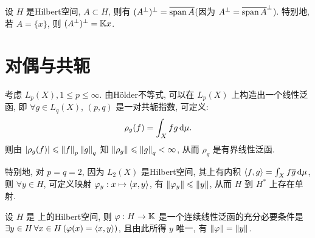     \begin{Remark}
        设 $ H $ 是Hilbert空间, $ A\subset H $, 则有 $ (A^{\bot})^{\bot}=\overline{\operatorname{span} A} $(因为 $ A^{\bot}=\overline{\operatorname{span} A}^{\bot} $). 特别地, 若 $ A=\{ x \} $, 则 $ (A^{\bot})^{\bot}=\mathbb{K} x $.
    \end{Remark}

\section{对偶与共轭}

    考虑 $ L_{p}(X), 1\leqslant p\leqslant\infty $. 由H\"older不等式, 可以在 $ L_{p}(X) $ 上构造出一个线性泛函, 即 $ \forall g\in L_{q}(X) $, $ (p, q) $ 是一对共轭指数, 可定义:
    \[
        \rho_{g}(f)=\int_{X}fg\,\mathrm{d}\mu.
    \]
    则由 $ \left| \rho_{g}(f) \right| \leqslant\left\| f \right\|_{p}\left\| g \right\|_{q} $ 知 $ \left\| \rho_{g} \right\|\leqslant\left\| g \right\|_{q}<\infty $, 从而 $ \rho_{g} $ 是有界线性泛函.

    特别地, 对 $ p=q=2 $, 因为 $ L_{2}(X) $ 是Hilbert空间, 其上有内积 $ \left\langle f, g \right\rangle=\int_{X}f\overline{g}\,\mathrm{d}\mu $, 则 $ \forall y\in H $, 可定义映射 $ \varphi_{y}:x\mapsto \left\langle x, y \right\rangle $, 有 $ \left\| \varphi_{y} \right\|\leqslant\left\| y \right\| $, 从而 $ H $ 到 $ H^{*} $ 上存在单射.

    \begin{Theorem}[Riesz表示定理]
         设 $ H $ 是 \K 上的Hilbert空间, 则 $ \varphi: H\to \mathbb{K} $ 是一个连续线性泛函的充分必要条件是 $ \exists y\in H\,\forall x\in H\,(\varphi(x)=\left\langle x, y \right\rangle) $, 且由此所得 $ y $ 唯一, 有 $ \left\| \varphi \right\|=\left\| y \right\| $.
    \end{Theorem}


